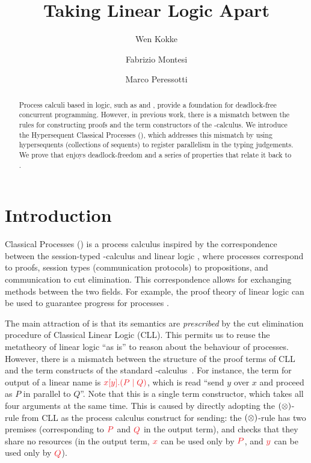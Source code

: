 \documentclass[submission,copyright,creativecommons]{eptcs}
\title{Taking Linear Logic Apart}
\author{%
  Wen Kokke
  \institute{University of Edinburgh\\ Edinburgh, Scotland}
  \email{wen.kokke@ed.ac.uk}
  \and
  Fabrizio Montesi
  \institute{University of Southern Denmark\\ Odense, Denmark}
  \email{fmontesi@imada.sdu.dk}
  \and
  Marco Peressotti
  \institute{University of Southern Denmark\\ Odense, Denmark}
  \email{peressotti@imada.sdu.dk}}
\begin{document}
\maketitle

\begin{abstract}
  Process calculi based in logic, such as \piDILL and \cp, provide a foundation for deadlock-free concurrent programming. However, in previous work, there is a mismatch between the rules for constructing proofs and the term constructors of the \textpi-calculus. We introduce the Hypersequent Classical Processes (\hcp), which addresses this mismatch by using hypersequents (collections of sequents) to register parallelism in the typing judgements. We prove that \hcp enjoys deadlock-freedom and a series of properties that relate it back to \cp.
\end{abstract}

\section{Introduction}
\label{sec:introduction}

Classical Processes (\cp) \citep{wadler2012} is a process calculus inspired by the correspondence between the session-typed \textpi-calculus and linear logic \citep{caires2010}, where processes correspond to proofs, session types (communication protocols) to propositions, and communication to cut elimination. This correspondence allows for exchanging methods between the two fields. For example, the proof theory of linear logic can be used to guarantee progress for processes \citep{caires2010,wadler2012}.

The main attraction of \cp is that its semantics are \emph{prescribed} by the cut elimination procedure of Classical Linear Logic (CLL). This permits us to reuse the metatheory of linear logic ``as is'' to reason about the behaviour of processes. However, there is a mismatch between the structure of the proof terms of CLL and the term constructs of the standard \textpi-calculus~\citep{milner1992a,milner1992b}. For instance, the term for output of a linear name is $\tm{\cpSend{x}{y}{P}{Q}}$, which is read ``send $y$ over $x$ and proceed as $P$ in parallel to $Q$''. Note that this is a single term constructor, which takes all four arguments at the same time. This is caused by directly adopting the $(\otimes)$-rule from CLL as the process calculus construct for sending: the $(\otimes)$-rule has two premises (corresponding to $\tm P$ and $\tm Q$ in the output term), and checks that they share no resources (in the output term, $\tm x$ can be used only by $\tm P$, and $\tm y$ can be used only by $\tm Q$).
\end{document}

